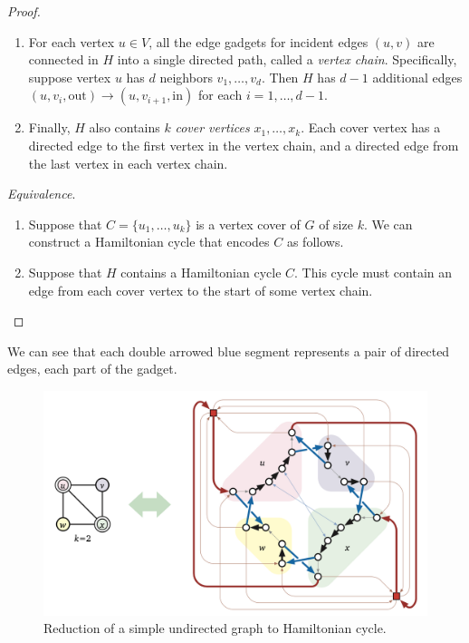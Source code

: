 \begin{proof}
\begin{enumerate}
        \item For each vertex $u \in V$, all the edge gadgets for incident edges $(u, v)$ are connected in $H$ into a single directed path, called a \textit{vertex chain}. Specifically, suppose vertex $u$ has $d$ neighbors $v_1, \ldots, v_d$. Then $H$ has $d-1$ additional edges $(u, v_i, \mathrm{out}) \rightarrow (u, v_{i+1}, \mathrm{in})$ for each $i = 1, \ldots, d-1$.  

        \item Finally, $H$ also contains $k$ \textit{cover vertices} $x_1, \ldots, x_k$. Each cover vertex has a directed edge to the first vertex in the vertex chain, and a directed edge from the last vertex in each vertex chain. 
      \end{enumerate}

      \textit{Equivalence}. 
      \begin{enumerate}
        \item Suppose that $C = \{u_1, \ldots, u_k\}$ is a vertex cover of $G$ of size $k$. We can construct a Hamiltonian cycle that encodes $C$ as follows. 
        \item Suppose that $H$ contains a Hamiltonian cycle $C$. This cycle must contain an edge from each cover vertex to the start of some vertex chain. 
      \end{enumerate}
    \end{proof}

    \begin{example}
      We can see that each double arrowed blue segment represents a pair of directed edges, each part of the gadget. 

      \begin{figure}[H]
        \centering 
        \includegraphics[scale=0.4]{img/ham_reduction.png}
        \caption{Reduction of a simple undirected graph to Hamiltonian cycle.} 
        \label{fig:ham_reduction}
      \end{figure}
    \end{example}

